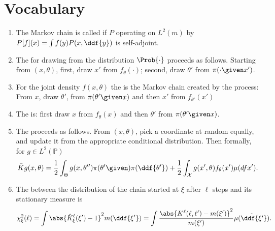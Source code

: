 \documentclass[12pt]{article}
\begin{document}
\hr

\section*{Vocabulary}
\begin{enumerate}
    \item
        The Markov chain is called  if \( P \)
        operating on \( L^2(m) \) by \( P[f](x) = \int f(y) P(x,\ddf{y})
        \) is self-adjoint.
    \item
        The  for drawing from the
        distribution \( \Prob{\cdot} \) proceeds as follows.  Starting
        from \( (x, \theta) \), first, draw \( x' \) from \( f_{\theta}(\cdot)
        \); second, draw \( \theta' \) from \( \pi(\cdot \given x') \).
    \item
        For the joint density \( f(x,\theta) \) the 
        is the Markov chain created by the process:  From \( x \), draw \(
        \theta' \), from \( \pi(\theta' \given x) \) and then \( x' \)
        from \( f_{\theta'}(x') \)
    \item
        The  is:  first draw \( x \) from \( f_
        {\theta}(x) \) and then \( \theta' \) from \( \pi(\theta' \given
        x) \).
    \item
        The  proceeds as follows.  From \( (x,
        \theta) \), pick a coordinate at random equally, and update it
        from the appropriate conditional distribution.  Then formally,
        for \( g \in L^2(\mathbb{P}) \)
        \[
            \bar{K} g(x,\theta) = \frac{1}{2} \int_{\Theta} g(x,\theta'')
            \pi(\theta' \given) \pi(\ddf{\theta'}) + \frac{1}{2} \int_{\mathcal
            {X}} g(x', \theta) f_{\theta}(x') \mu(df{x'}).
        \]
    \item
        The  between the distribution of the
        chain started at \( \xi \) after \( \ell \) steps and its
        stationary measure is
        \[
            \chi^2_{\xi}(\ell) = \int \abs{\hat{K}^{\ell}_{\xi}(\xi') -1}^
            {2} m(\ddf{\xi'})
            = \int \frac{\abs{K^{\ell}(\ell, \ell') - m(\xi')}^2}{m(\xi')}
            \tilde{\mu(\ddf{\xi'})}.
        \]
\end{enumerate}

\hr
\end{document}
